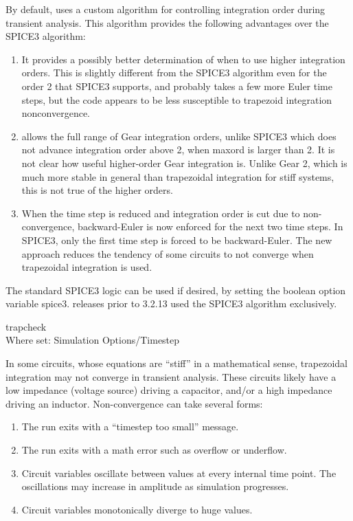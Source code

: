 \begin{description}
By default, {\WRspice} uses a custom algorithm for controlling
integration order during transient analysis.  This algorithm provides
the following advantages over the SPICE3 algorithm:

\begin{enumerate}
\item{It provides a possibly better determination of when to use 
higher integration orders.  This is slightly different from the
SPICE3 algorithm even for the order 2 that SPICE3 supports, and  
probably takes a few more Euler time steps, but the
{\WRspice} code appears to be less susceptible to trapezoid 
integration nonconvergence.}

\item{{\WRspice} allows the full range of Gear integration orders,
unlike SPICE3 which does not advance integration order above 2, when
{\et maxord} is larger than 2.  It is not clear how useful
higher-order Gear integration is.  Unlike Gear 2, which is much more
stable in general than trapezoidal integration for stiff systems, this
is not true of the higher orders.}

\item{When the time step is reduced and integration order is cut due
to non-convergence, backward-Euler is now enforced for the next two
time steps.  In SPICE3, only the first time step is forced to be
backward-Euler.  The new approach reduces the tendency of some
circuits to not converge when trapezoidal integration is used.}
\end{enumerate}

The standard SPICE3 logic can be used if desired, by setting the
boolean option variable {\et spice3}.  {\WRspice} releases prior to
3.2.13 used the SPICE3 algorithm exclusively.

\item{\et trapcheck}\\
Where set: {\cb Simulation Options/Timestep}

In some circuits, whose equations are ``stiff'' in a mathematical
sense, trapezoidal integration may not converge in transient analysis. 
These circuits likely have a low impedance (voltage source) driving a
capacitor, and/or a high impedance driving an inductor. 
Non-convergence can take several forms:

\begin{enumerate}
\item{The run exits with a ``timestep too small'' message.}
\item{The run exits with a math error such as overflow or underflow.}
\item{Circuit variables oscillate between values at every internal
 time point.  The oscillations may increase in amplitude as simulation
 progresses.}
\item{Circuit variables monotonically diverge to huge values.}
\end{enumerate}


\end{description}
